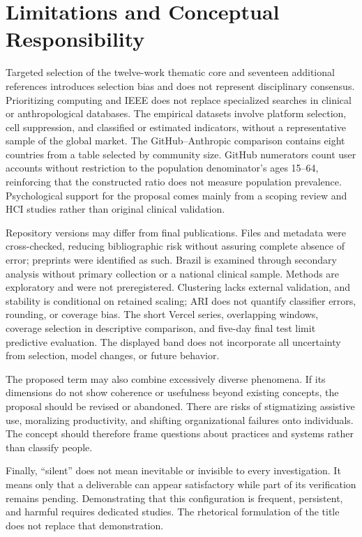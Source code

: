 \documentclass[11pt,a4paper]{article}
\begin{document}
\section{Limitations and Conceptual Responsibility}
Targeted selection of the twelve-work thematic core and seventeen additional references introduces selection bias and does not represent disciplinary consensus. Prioritizing computing and IEEE does not replace specialized searches in clinical or anthropological databases. The empirical datasets involve platform selection, cell suppression, and classified or estimated indicators, without a representative sample of the global market. The GitHub--Anthropic comparison contains eight countries from a table selected by community size. GitHub numerators count user accounts without restriction to the population denominator's ages 15--64, reinforcing that the constructed ratio does not measure population prevalence. Psychological support for the proposal comes mainly from a scoping review and HCI studies rather than original clinical validation.

Repository versions may differ from final publications. Files and metadata were cross-checked, reducing bibliographic risk without assuring complete absence of error; preprints were identified as such. Brazil is examined through secondary analysis without primary collection or a national clinical sample. Methods are exploratory and were not preregistered. Clustering lacks external validation, and stability is conditional on retained scaling; ARI does not quantify classifier errors, rounding, or coverage bias. The short Vercel series, overlapping windows, coverage selection in descriptive comparison, and five-day final test limit predictive evaluation. The displayed band does not incorporate all uncertainty from selection, model changes, or future behavior.

The proposed term may also combine excessively diverse phenomena. If its dimensions do not show coherence or usefulness beyond existing concepts, the proposal should be revised or abandoned. There are risks of stigmatizing assistive use, moralizing productivity, and shifting organizational failures onto individuals. The concept should therefore frame questions about practices and systems rather than classify people.

Finally, ``silent'' does not mean inevitable or invisible to every investigation. It means only that a deliverable can appear satisfactory while part of its verification remains pending. Demonstrating that this configuration is frequent, persistent, and harmful requires dedicated studies. The rhetorical formulation of the title does not replace that demonstration.
\end{document}
